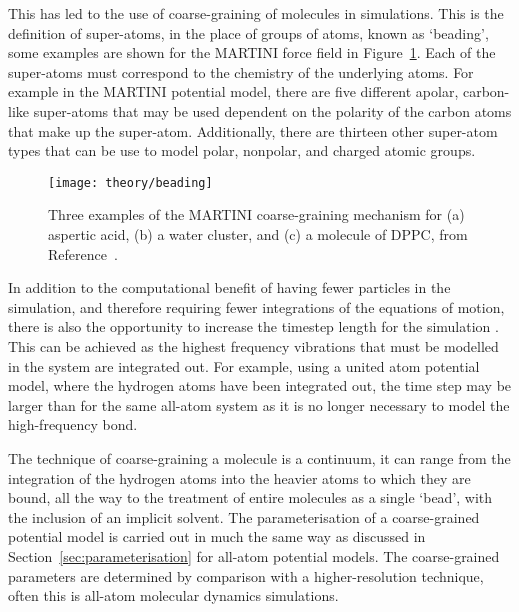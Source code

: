 This has led to the use of coarse-graining of molecules in simulations.
This is the definition of super-atoms, in the place of groups of atoms, known as `beading', some examples are shown for the MARTINI force field in Figure~\ref{fig:cg}.
Each of the super-atoms must correspond to the chemistry of the underlying atoms.
For example in the MARTINI potential model, there are five different apolar, carbon-like super-atoms that may be used dependent on the polarity of the carbon atoms that make up the super-atom.
Additionally, there are thirteen other super-atom types that can be use to model polar, nonpolar, and charged atomic groups.
%
\begin{figure}
    \centering
    \texttt{[image: theory/beading]}
    \caption{Three examples of the MARTINI coarse-graining mechanism for (a) aspertic acid, (b) a water cluster, and (c) a molecule of DPPC, from Reference~\cite{pluhackova_biomembranes_2015}.}
    \label{fig:cg}
\end{figure}
%

In addition to the computational benefit of having fewer particles in the simulation, and therefore requiring fewer integrations of the equations of motion, there is also the opportunity to increase the timestep length for the simulation \cite{pluhackova_biomembranes_2015}.
This can be achieved as the highest frequency vibrations that must be modelled in the system are integrated out.
For example, using a united atom potential model, where the hydrogen atoms have been integrated out, the time step may be larger than for the same all-atom system as it is no longer necessary to model the high-frequency  bond.

The technique of coarse-graining a molecule is a continuum, it can range from the integration of the hydrogen atoms into the heavier atoms to which they are bound, all the way to the treatment of entire molecules as a single `bead', with the inclusion of an implicit solvent.
The parameterisation of a coarse-grained potential model is carried out in much the same way as discussed in Section~\ref{sec:parameterisation} for all-atom potential models.
The coarse-grained parameters are determined by comparison with a higher-resolution technique, often this is all-atom molecular dynamics simulations.
